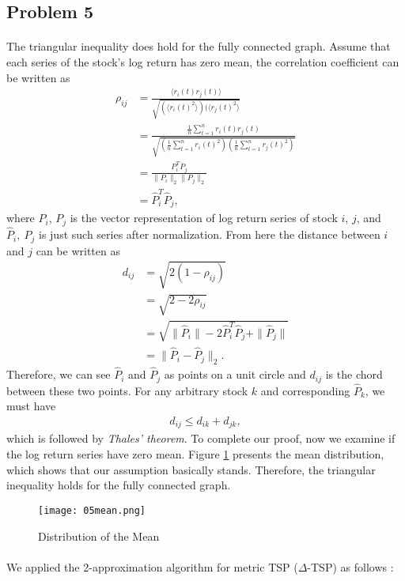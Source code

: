 \subsection*{Problem 5}
\paragraph{}
The triangular inequality does hold for the fully connected graph. Assume that each series of the stock's log return has zero mean, the correlation coefficient can be written as 
\begin{align*}
\rho_{ij} &= \frac{\langle r_i(t)r_j(t)\rangle}{\sqrt{(\langle r_i(t)^2\rangle)(\langle r_j(t)^2\rangle}} \\
&=\frac{\frac{1}{n}\sum_{t = 1}^{n} r_i(t)r_j(t)}{\sqrt{(\frac{1}{n}\sum_{t = 1}^{n}r_i(t)^2)(\frac{1}{n}\sum_{t = 1}^{n}r_j(t)^2)}} \\
&=\frac{P_i^TP_j}{\|P_i\|_2 \|P_j\|_2}\\
&=\hat{P}_i^T\hat{P}_j,
\end{align*}
where $P_i$, $P_j$ is the vector representation of log return series of stock $i$, $j$, and $\hat{P}_i,\ \hat{P}_j$ is just such series after normalization. From here the distance between $i$ and $j$ can be written as
\begin{align*}
d_{ij} 	& = \sqrt{2(1-\rho_{ij})}\\
	 	& = \sqrt{2 - 2 \rho_{ij}}\\
 		& = \sqrt{\|\hat{P}_i\| - 2\hat{P}_i^T\hat{P}_j + \|\hat{P}_j\|}\\
 		& = \|\hat{P}_i - \hat{P}_j\|_2.
\end{align*}
Therefore, we can see $\hat{P}_i$ and $\hat{P}_j$ as points on a unit circle and $d_{ij}$ is the chord between these two points. For any arbitrary stock $k$ and corresponding $\hat{P}_k$, we must have 
\begin{align*}
d_{ij} \leq d_{ik} + d_{jk},
\end{align*}
which is followed by \textit{Thales' theorem}. To complete our proof, now we examine if the log return series have zero mean. Figure \ref{fig:05mean} presents the mean distribution, which shows that our assumption basically stands. Therefore, the triangular inequality holds for the fully connected graph.
\begin{figure}[h!]
	\centering
	\texttt{[image: 05mean.png]}
	\caption{Distribution of the Mean}	
	\label{fig:05mean} 
\end{figure}
\paragraph{}
We applied the 2-approximation algorithm for metric TSP ($\Delta$-TSP) as follows \cite{tsp}:

